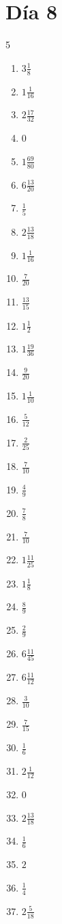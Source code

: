 \documentclass[12pt]{article}
\begin{document}
\section*{Día 8}
\begin{multicols}{5}\begin{enumerate}
\item $ 3 \frac{1}{8} $
\item $ 1 \frac{1}{16} $
\item $ 2 \frac{17}{32} $
\item $ 0 $
\item $ 1 \frac{69}{80} $
\item $ 6 \frac{13}{20} $
\item $ \frac{1}{5} $
\item $ 2 \frac{13}{18} $
\item $ 1 \frac{1}{16} $
\item $ \frac{7}{20} $
\item $ \frac{13}{15} $
\item $ 1 \frac{1}{2} $
\item $ 1 \frac{19}{36} $
\item $ \frac{9}{20} $
\item $ 1 \frac{1}{10} $
\item $ \frac{5}{12} $
\item $ \frac{2}{25} $
\item $ \frac{7}{10} $
\item $ \frac{4}{9} $
\item $ \frac{7}{8} $
\item $ \frac{7}{10} $
\item $ 1 \frac{11}{25} $
\item $ 1 \frac{1}{8} $
\item $ \frac{8}{9} $
\item $ \frac{2}{9} $
\item $ 6 \frac{11}{45} $
\item $ 6 \frac{11}{12} $
\item $ \frac{3}{10} $
\item $ \frac{7}{15} $
\item $ \frac{1}{6} $
\item $ 2 \frac{1}{12} $
\item $ 0 $
\item $ 2 \frac{13}{18} $
\item $ \frac{1}{6} $
\item $ 2 $
\item $ \frac{1}{4} $
\item $ 2 \frac{5}{18} $

\end{enumerate}
\end{multicols}
\end{document}
